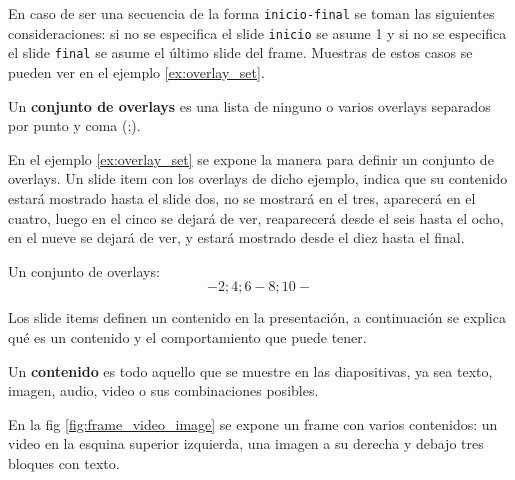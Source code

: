  		En caso de ser una secuencia de la forma \texttt{inicio-final} se toman las siguientes consideraciones: si no se especifica el slide \texttt{inicio} se asume 1 y si no se especifica el slide \texttt{final} se asume el último slide del frame. Muestras de estos casos se pueden ver en el ejemplo \ref{ex:overlay_set}. 		

 		\begin{definition}
 		\label{def:ovaerlay_set}
 			Un \textbf{conjunto de overlays} es una lista de ninguno o varios overlays separados por punto y coma (;).
 		\end{definition} 


		En el ejemplo \ref{ex:overlay_set} se expone la manera para definir un conjunto de overlays. Un slide item con los overlays de dicho ejemplo, indica que su contenido estará mostrado hasta el slide dos, no se mostrará en el tres, aparecerá en el cuatro, luego en el cinco se dejará de ver, reaparecerá desde el seis hasta el ocho, en el nueve se dejará de ver, y estará mostrado desde el diez hasta el final.  	

 		\begin{example}
 		\label{ex:overlay_set}
 			Un conjunto de overlays:
 			$$-2; 4; 6-8; 10-$$
 		\end{example}	

					
		Los slide items definen un contenido en la presentación, a continuación se explica qué es un contenido y el comportamiento que puede tener.
		\begin{definition}
		\label{def:content}
			Un \textbf{contenido} es todo aquello que se muestre en las diapositivas, ya sea texto, imagen, audio, video o sus combinaciones posibles. 
		\end{definition}


		En la fig \ref{fig:frame_video_image} se expone un frame con varios contenidos: un video en la esquina superior izquierda, una imagen a su derecha y debajo tres bloques con texto.


